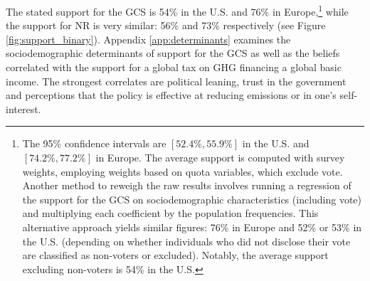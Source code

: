 The stated support for the GCS is 54\% in the U.S. and 76\% in Europe,\footnote{The 95\% confidence intervals are $[52.4\%, 55.9\%]$ in the U.S. and $[74.2\%, 77.2\%]$ in Europe. The average support is computed with survey weights, employing weights based on quota variables, which exclude vote. Another method to reweigh the raw results involves running a regression of the support for the GCS on sociodemographic characteristics (including vote) and multiplying each coefficient by the population frequencies. This alternative approach yields similar figures: 76\% in Europe and 52\% or 53\% in the U.S. (depending on whether individuals who did not disclose their vote are classified as non-voters or excluded). Notably, the average support excluding non-voters is 54\% in the U.S.} while the support for NR is very similar: 56\% and 73\% respectively (see Figure \ref{fig:support_binary}). Appendix \ref{app:determinants} examines the sociodemographic determinants of support for the GCS as well as the beliefs correlated with the support for a global tax on GHG financing a global basic income. The strongest correlates are political leaning, trust in the government and perceptions that the policy is effective at reducing emissions or in one's self-interest. %

